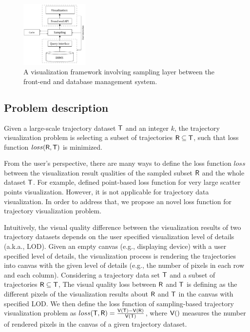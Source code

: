 \begin{figure}[t]
	\centering
	\includegraphics[width=0.3\textwidth]{pictures/framework/DBVAframework.pdf}
	\vspace{-5mm}
	\caption{A visualization framework involving sampling layer between the front-end and database management system.}
	\vspace{-5mm}
	\label{fig:framework}
\end{figure}



\subsection{Problem description}
\begin{problem}\label{prob:def}
Given a large-scale trajectory dataset $\mathsf{T}$ and an integer $k$,
the trajectory visualization problem is selecting a subset of trajectories $\mathsf{R} \subseteq \mathsf{T}$, such that loss function $loss(\mathsf{R},\mathsf{T})$ is minimized.
\end{problem}

From the user’s perspective, there are many ways to define the loss function $loss$ between the visualization result qualities of the sampled subset $\mathsf{R}$ and the whole dataset $\mathsf{T}$.
For example, \cite{park2016visualization} defined point-based loss function for very large scatter points visualization.
However, it is not applicable for trajectory data visualization.
In order to address that, we propose an novel loss function for trajectory visualization problem.

Intuitively, the visual quality difference between the visualization results of two trajectory datasets depends on the user specified visualization level of details (a.k.a., LOD).
Given an empty canvas (e.g., displaying device) with a user specified level of details, 
the visualization process is rendering the trajectories into canvas with the given level of details (e.g., the number of pixels in each row and each column).
Considering a trajectory data set $\mathsf{T}$ and a subset of trajectories $\mathsf{R} \subseteq \mathsf{T}$,
The visual quality loss between $\mathsf{R}$ and $\mathsf{T}$ is defining as the different pixels of the visualization results about $\mathsf{R}$ and $\mathsf{T}$ in the canvas with specified LOD.
We then define the loss function of sampling-based trajectory visualization problem as $loss(\mathsf{T}, \mathsf{R}) = \frac{\mathsf{V}(\mathsf{T}) - \mathsf{V}(\mathsf{R})}{\mathsf{V}(\mathsf{T})}$,
where $\mathsf{V}()$ measures the number of rendered pixels in the canvas of a given trajectory dataset.

